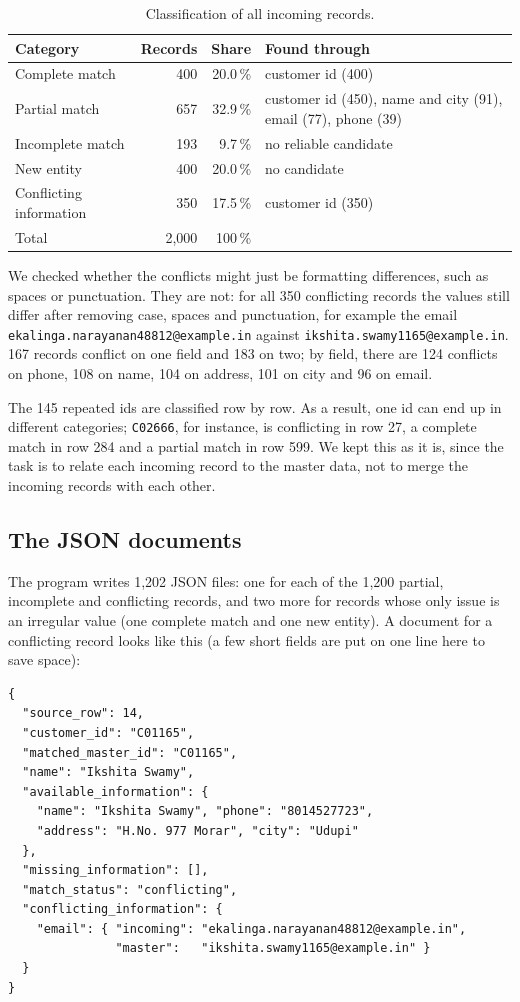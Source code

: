 \documentclass[11pt,a4paper]{article}
\newcommand{\file}[1]{\texttt{#1}}
\begin{document}
\begin{table}[H]
\centering
\small
\begin{tabular}{@{}lrrl@{}}
\toprule
Category & Records & Share & Found through \\
\midrule
Complete match & 400 & 20.0\,\% & customer id (400) \\
Partial match & 657 & 32.9\,\% & customer id (450), name and city (91), email (77), phone (39) \\
Incomplete match & 193 & 9.7\,\% & no reliable candidate \\
New entity & 400 & 20.0\,\% & no candidate \\
Conflicting information & 350 & 17.5\,\% & customer id (350) \\
\midrule
Total & 2{,}000 & 100\,\% & \\
\bottomrule
\end{tabular}
\caption{Classification of all incoming records.}
\end{table}

We checked whether the conflicts might just be formatting differences, such as
spaces or punctuation. They are not: for all 350 conflicting records the values
still differ after removing case, spaces and punctuation, for example the email
\file{ekalinga.narayanan48812@example.in} against
\file{ikshita.swamy1165@example.in}. 167 records conflict on one field and 183
on two; by field, there are 124 conflicts on phone, 108 on name, 104 on
address, 101 on city and 96 on email.

The 145 repeated ids are classified row by row. As a result, one id can end
up in different categories; \file{C02666}, for instance, is conflicting in row
27, a complete match in row 284 and a partial match in row 599. We kept this as
it is, since the task is to relate each incoming record to the master data,
not to merge the incoming records with each other.

\subsection{The JSON documents}

The program writes 1{,}202 JSON files: one for each of the 1{,}200 partial,
incomplete and conflicting records, and two more for records whose only issue
is an irregular value (one complete match and one new entity). A document for
a conflicting record looks like this (a few short fields are put on one line
here to save space):

\begin{lstlisting}
{
  "source_row": 14,
  "customer_id": "C01165",
  "matched_master_id": "C01165",
  "name": "Ikshita Swamy",
  "available_information": {
    "name": "Ikshita Swamy", "phone": "8014527723",
    "address": "H.No. 977 Morar", "city": "Udupi"
  },
  "missing_information": [],
  "match_status": "conflicting",
  "conflicting_information": {
    "email": { "incoming": "ekalinga.narayanan48812@example.in",
               "master":   "ikshita.swamy1165@example.in" }
  }
}
\end{lstlisting}
\end{document}
